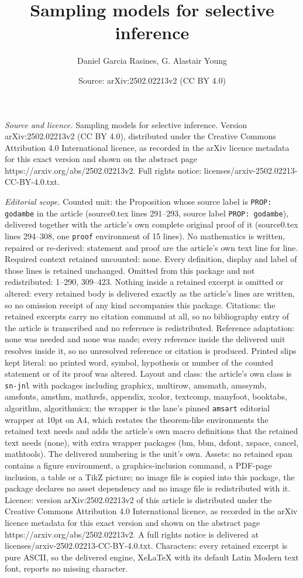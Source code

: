 \documentclass[10pt,a4paper]{amsart}
\title[Sampling models for selective inference]{Sampling models for selective inference}
\author{Daniel Garcia Rasines, G. Alastair Young}
\date{Source: arXiv:2502.02213v2 (CC BY 4.0)}
\begin{document}
\maketitle

\noindent\emph{Source and licence.} Sampling models for selective inference. Version arXiv:2502.02213v2 (CC BY 4.0), distributed under the Creative Commons Attribution 4.0 International licence, as recorded in the arXiv licence metadata for this exact version and shown on the abstract page https://arxiv.org/abs/2502.02213v2. Full rights notice: licenses/arxiv-2502.02213-CC-BY-4.0.txt.\par\smallskip

\noindent\textit{Editorial scope.} Counted unit: the Proposition whose source label is \texttt{PROP: godambe} in the article (source0.tex lines 291--293, source label \texttt{PROP: godambe}), delivered together with the article's own complete original proof of it (source0.tex lines 294--308, one \texttt{proof} environment of 15 lines). No mathematics is written, repaired or re-derived: statement and proof are the article's own text line for line. Required context retained uncounted: none. Every definition, display and label of those lines is retained unchanged. Omitted from this package and not redistributed: 1--290, 309--423. Nothing inside a retained excerpt is omitted or altered: every retained body is delivered exactly as the article's lines are written, so no omission receipt of any kind accompanies this package. Citations: the retained excerpts carry no citation command at all, so no bibliography entry of the article is transcribed and no reference is redistributed. Reference adaptation: none was needed and none was made; every reference inside the delivered unit resolves inside it, so no unresolved reference or citation is produced. Printed slips kept literal: no printed word, symbol, hypothesis or number of the counted statement or of its proof was altered. Layout and class: the article's own class is \texttt{sn-jnl} with packages including graphicx, multirow, amsmath, amssymb, amsfonts, amsthm, mathrsfs, appendix, xcolor, textcomp, manyfoot, booktabs, algorithm, algorithmicx; the wrapper is the lane's pinned \texttt{amsart} editorial wrapper at 10pt on A4, which restates the theorem-like environments the retained text needs and adds the article's own macro definitions that the retained text needs (none), with extra wrapper packages (bm, bbm, dsfont, xspace, cancel, mathtools). The delivered numbering is the unit's own. Assets: no retained span contains a figure environment, a graphics-inclusion command, a PDF-page inclusion, a table or a TikZ picture; no image file is copied into this package, the package declares no asset dependency and no image file is redistributed with it. Licence: version arXiv:2502.02213v2 of this article is distributed under the Creative Commons Attribution 4.0 International licence, as recorded in the arXiv licence metadata for this exact version and shown on the abstract page https://arxiv.org/abs/2502.02213v2. A full rights notice is delivered at licenses/arxiv-2502.02213-CC-BY-4.0.txt. Characters: every retained excerpt is pure ASCII, so the delivered engine, XeLaTeX with its default Latin Modern text font, reports no missing character.
\end{document}
